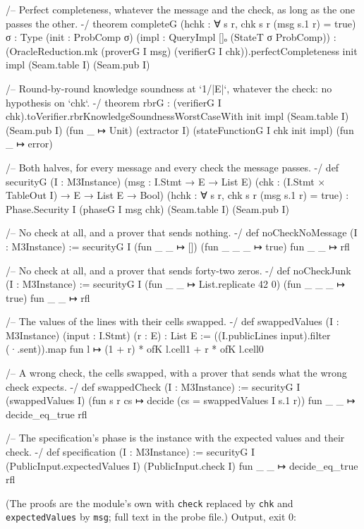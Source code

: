 \begin{leancode}
/-- Perfect completeness, whatever the message and the check, as long as the one passes the
other. -/
theorem completeG (hchk : ∀ s r, chk s r (msg s.1 r) = true) {σ : Type} (init : ProbComp σ)
    (impl : QueryImpl []ₒ (StateT σ ProbComp)) :
    (OracleReduction.mk (proverG I msg) (verifierG I chk)).perfectCompleteness init impl
      (Seam.table I) (Seam.pub I)

/-- Round-by-round knowledge soundness at `1/|E|`, whatever the check: no hypothesis on
`chk`. -/
theorem rbrG :
    (verifierG I chk).toVerifier.rbrKnowledgeSoundnessWorstCaseWith init impl (Seam.table I)
      (Seam.pub I) (fun _ ↦ Unit) (extractor I) (stateFunctionG I chk init impl)
      (fun _ ↦ error)

/-- Both halves, for every message and every check the message passes. -/
def securityG (I : M3Instance) (msg : I.Stmt → E → List E)
    (chk : (I.Stmt × TableOut I) → E → List E → Bool)
    (hchk : ∀ s r, chk s r (msg s.1 r) = true) :
    Phase.Security I (phaseG I msg chk) (Seam.table I) (Seam.pub I)

/-- No check at all, and a prover that sends nothing. -/
def noCheckNoMessage (I : M3Instance) := securityG I (fun _ _ ↦ []) (fun _ _ _ ↦ true)
  fun _ _ ↦ rfl

/-- No check at all, and a prover that sends forty-two zeros. -/
def noCheckJunk (I : M3Instance) :=
  securityG I (fun _ _ ↦ List.replicate 42 0) (fun _ _ _ ↦ true) fun _ _ ↦ rfl

/-- The values of the lines with their cells swapped. -/
def swappedValues (I : M3Instance) (input : I.Stmt) (r : E) : List E :=
  ((I.publicLines input).filter (·.sent)).map fun l ↦ (1 + r) * ofK l.cell1 + r * ofK l.cell0

/-- A wrong check, the cells swapped, with a prover that sends what the wrong check expects. -/
def swappedCheck (I : M3Instance) :=
  securityG I (swappedValues I) (fun s r cs ↦ decide (cs = swappedValues I s.1 r))
    fun _ _ ↦ decide_eq_true rfl

/-- The specification's phase is the instance with the expected values and their check. -/
def specification (I : M3Instance) :=
  securityG I (PublicInput.expectedValues I) (PublicInput.check I) fun _ _ ↦ decide_eq_true rfl
\end{leancode}

(The proofs are the module's own with \texttt{check} replaced by \texttt{chk} and \texttt{expectedValues} by \texttt{msg}; full text in the probe file.) Output, exit 0:

